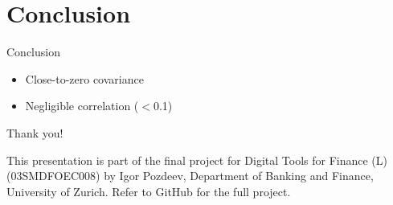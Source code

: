 \documentclass[11pt]{beamer}
\begin{document}

\section{Conclusion}
\begin{frame}{Conclusion}
    \begin{itemize}
    \item Close-to-zero covariance
    \item Negligible correlation ($<$0.1)
    \end{itemize}
    
\vspace{20}
    
\end{frame}


\begin{frame}

\begin{center}
    Thank you!


    \vfill
    \tiny{This presentation is part of the final project for Digital Tools for Finance (L) (03SMDFOEC008) by Igor Pozdeev, Department of Banking and Finance, University of Zurich. Refer to GitHub for the full project.}
\end{center}

\end{frame}
\end{document}

